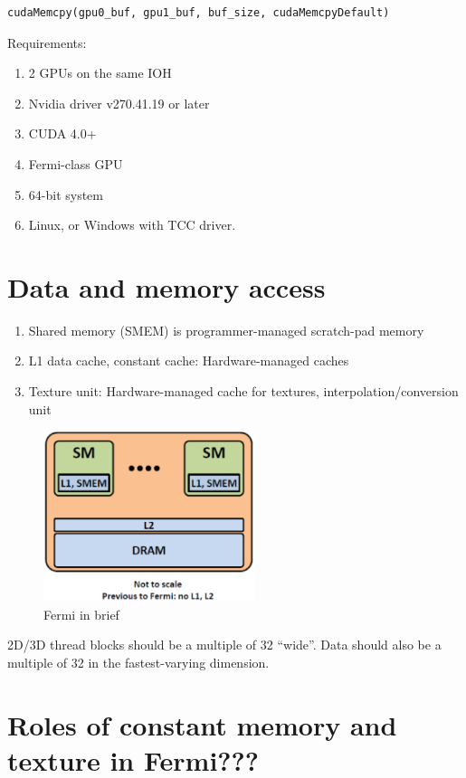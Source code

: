 \begin{verbatim}
cudaMemcpy(gpu0_buf, gpu1_buf, buf_size, cudaMemcpyDefault) 
\end{verbatim}

Requirements:
\begin{enumerate}
  \item 2 GPUs on the same IOH
  \item Nvidia driver v270.41.19 or later
  \item CUDA 4.0+
  \item Fermi-class GPU
  \item 64-bit system
  \item Linux, or Windows with TCC driver.
\end{enumerate}

\section{Data and memory access}
\label{sec:data-memory-access}


\begin{enumerate}
\item Shared memory (SMEM) is programmer-managed scratch-pad memory

\item L1 data cache, constant cache: Hardware-managed caches

\item Texture unit: Hardware-managed cache for textures,
  interpolation/conversion unit
\end{enumerate}

\begin{figure}[hbt]
  \centerline{\includegraphics[height=5cm,
    angle=0]{./images/Fermi.eps}}
\caption{Fermi in brief}
\label{fig:Fermi}
\end{figure}

2D/3D thread blocks should be a multiple of 32 ``wide''. Data should
also be a multiple of 32 in the fastest-varying dimension. 


\section{Roles of constant memory and texture in Fermi???}
\label{sec:roles-const-text}

